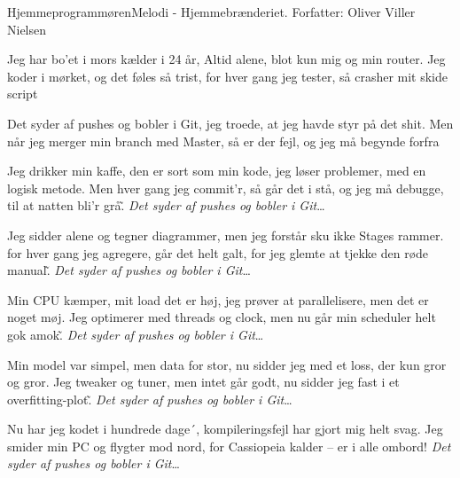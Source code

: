 \begin{sang}{Hjemmeprogrammøren}{Melodi - Hjemmebrænderiet. Forfatter: Oliver Viller Nielsen}

\begin{vers}
Jeg har bo'et i mors kælder i 24 år,
Altid alene, blot kun \- mig og min router.
Jeg koder i mørket, og det føles så trist,
for hver gang jeg tester, så crasher mit skide script
\end{vers}

\begin{omkvaed}
Det syder af pushes og bobler i Git,
jeg troede, at jeg havde styr på det shit.
Men når jeg merger min branch med Master,
så er der fejl, og jeg må begynde forfra
\end{omkvaed}


\begin{vers} 
Jeg drikker min kaffe, den er sort som min kode, 
jeg løser problemer, med en logisk metode. 
Men hver gang jeg commit’r, så går det i stå,
og jeg må debugge, til at natten bli’r grå\~.
\emph{Det syder af pushes og bobler i Git}\ldots
\end{vers}

\begin{vers}
Jeg sidder alene og tegner diagrammer,
men jeg forstår sku ikke Stages rammer.
for hver gang jeg agregere, går det helt galt,
for jeg glemte at tjekke den røde manual\~.
\emph{Det syder af pushes og bobler i Git}\ldots
\end{vers}

\begin{vers}
Min CPU kæmper, mit load det er høj,
jeg prøver at parallelisere, men det er noget møj.
Jeg optimerer med threads og clock,
men nu går min scheduler helt gok amok\~.
\emph{Det syder af pushes og bobler i Git}\ldots
\end{vers}

\begin{vers}
Min model var simpel, men data for stor,
nu sidder jeg med et loss, der kun gror og gror.
Jeg tweaker og tuner, men intet går godt, 
nu sidder jeg fast i et overfitting-plot\~.
\emph{Det syder af pushes og bobler i Git}\ldots
\end{vers}

\begin{vers}
Nu har jeg kodet i hundrede dage´,
kompileringsfejl har gjort mig helt svag.
Jeg smider min PC og flygter mod nord,
for Cassiopeia kalder – er i alle ombord!
\emph{Det syder af pushes og bobler i Git}\ldots
\end{vers}

\laps

\end{sang}